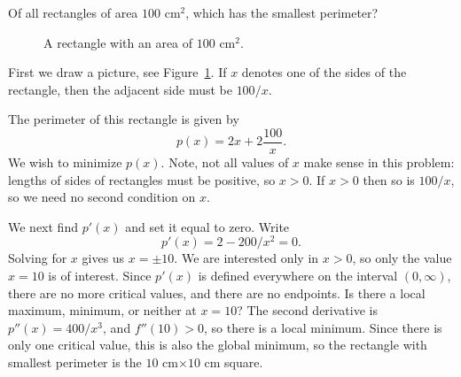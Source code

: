 \begin{example}
    Of all rectangles of area $100$ cm$^2$, which has the smallest
    perimeter? \cite{mooc}
    
    \begin{figure}[H]
    \centering
    \caption{A rectangle with an area of $100$ cm$^2$.}
    \label{fig:rect100}
    \end{figure}
    
    \begin{solution}
    First we draw a picture, see Figure~\ref{fig:rect100}.  If $x$ denotes
    one of the sides of the rectangle, then the adjacent side must be
    $100/x$.
    
    
    The perimeter of this rectangle is given by
    \[
    p(x)=2x+2\frac{100}{x}.
    \]
    We wish to minimize $p(x)$.  Note, not all values of $x$ make sense in
    this problem: lengths of sides of rectangles must be positive, so
    $x>0$. If $x>0$ then so is $100/x$, so we need no second condition on
    $x$.
    
    We next find $p'(x)$ and set it equal to zero. Write
    \[
    p'(x)=2-200/x^2 = 0.
    \]
    Solving for $x$ gives us $x=\pm 10$. We are interested only in $x>0$,
    so only the value $x=10$ is of interest. Since $p'(x)$ is defined
    everywhere on the interval $(0,\infty)$, there are no more critical
    values, and there are no endpoints. Is there a local maximum, minimum,
    or neither at $x=10$? The second derivative is $p''(x)=400/x^3$, and
    $f''(10)>0$, so there is a local minimum. Since there is only one
    critical value, this is also the global minimum, so the rectangle with
    smallest perimeter is the $10$ cm$\times10$ cm square.
    \end{solution}
\end{example}

